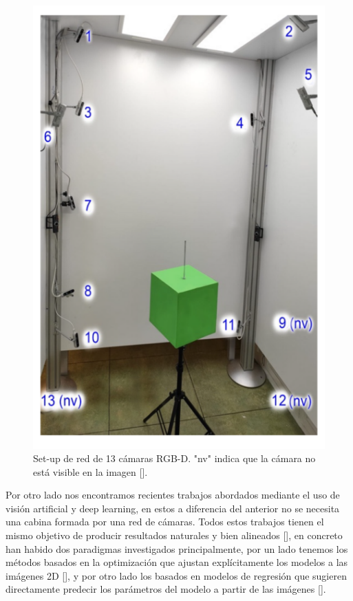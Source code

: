 \begin{figure}[H]
	\centering
	\includegraphics[scale=0.35]{imagenes/estadoarte1.png}
	\caption{Set-up de red de 13 cámaras RGB-D. "nv" indica que la cámara no está visible en la imagen [\cite{Nahuel1}].}
	\label{fig:figura2}
\end{figure}


Por otro lado nos encontramos recientes trabajos abordados mediante el uso de visión artificial y deep learning, en estos a diferencia del anterior no se necesita una cabina formada por una red de cámaras. Todos estos trabajos tienen el mismo objetivo de producir resultados naturales y bien alineados [\cite{pymaf}], en concreto han habido dos paradigmas investigados principalmente, por un lado tenemos los métodos basados en la optimización que ajustan explícitamente los modelos a las imágenes 2D [\cite{keepsmpl}], y por otro lado los basados en modelos de regresión que sugieren directamente predecir los parámetros del modelo a partir de las imágenes [\cite{pymaf}].

